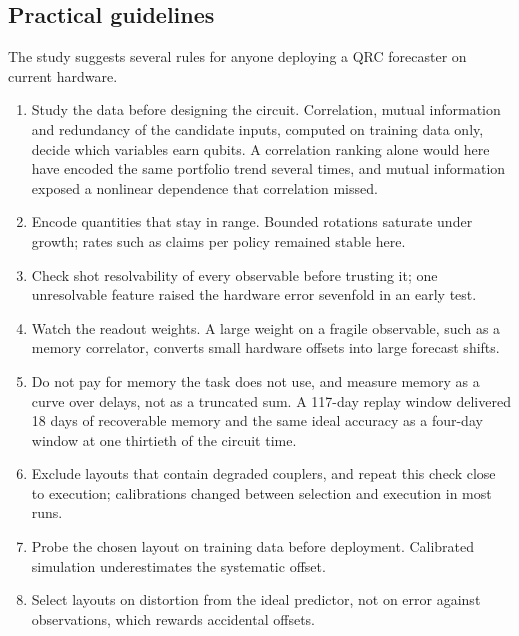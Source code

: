 \documentclass[journal]{IEEEtran}
\begin{document}
\subsection{Practical guidelines}
The study suggests several rules for anyone deploying a QRC forecaster on current hardware.
\begin{enumerate}
\item Study the data before designing the circuit. Correlation, mutual information and redundancy of the candidate inputs, computed on training data only, decide which variables earn qubits. A correlation ranking alone would here have encoded the same portfolio trend several times, and mutual information exposed a nonlinear dependence that correlation missed.
\item Encode quantities that stay in range. Bounded rotations saturate under growth; rates such as claims per policy remained stable here.
\item Check shot resolvability of every observable before trusting it; one unresolvable feature raised the hardware error sevenfold in an early test.
\item Watch the readout weights. A large weight on a fragile observable, such as a memory correlator, converts small hardware offsets into large forecast shifts.
\item Do not pay for memory the task does not use, and measure memory as a curve over delays, not as a truncated sum. A 117-day replay window delivered 18 days of recoverable memory and the same ideal accuracy as a four-day window at one thirtieth of the circuit time.
\item Exclude layouts that contain degraded couplers, and repeat this check close to execution; calibrations changed between selection and execution in most runs.
\item Probe the chosen layout on training data before deployment. Calibrated simulation underestimates the systematic offset.
\item Select layouts on distortion from the ideal predictor, not on error against observations, which rewards accidental offsets.
\end{enumerate}
\end{document}
